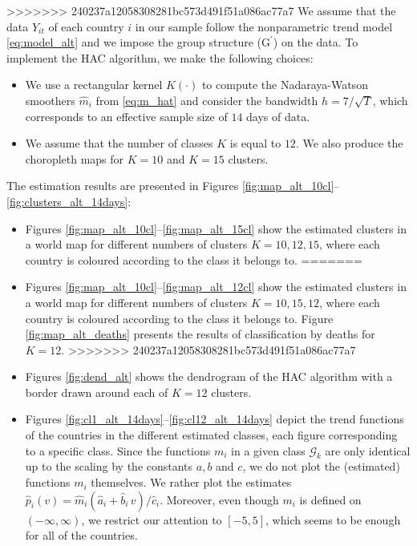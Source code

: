 \documentclass[a4paper,12pt]{article}
\numberwithin{equation}{section}
\begin{document}
>>>>>>> 240237a12058308281bc573d491f51a086ac77a7
We assume that the data $Y_{it}$ of each country $i$ in our sample follow the nonparametric trend model \eqref{eq:model_alt}
and we impose the group structure ($\text{G}^\prime$) on the data. 
To implement the HAC algorithm, we make the following choices:
\begin{itemize}[leftmargin=0.6cm]
\item We use a rectangular kernel $K(\cdot)$ to compute the Nadaraya-Watson smoothers $\hat{m}_{i}$ from \eqref{eq:m_hat} and consider the bandwidth $h = 7/\sqrt{T}$, which corresponds to an effective sample size of $14$ days of data. 
\item We assume that the number of classes $K$ is equal to $12$. We also produce the choropleth maps for $K=10$ and $K = 15$ clusters.
\end{itemize}
The estimation results are presented in Figures \ref{fig:map_alt_10cl}--\ref{fig:clusters_alt_14days}:
\begin{itemize}[leftmargin=0.6cm]
<<<<<<< HEAD
\item Figures \ref{fig:map_alt_10cl}--\ref{fig:map_alt_15cl} show the estimated clusters in a world map for different numbers of clusters $K =10, 12, 15$, where each country is coloured according to the class it belongs to. 
=======
\item Figures \ref{fig:map_alt_10cl}--\ref{fig:map_alt_12cl} show the estimated clusters in a world map for different numbers of clusters $K =10, 15, 12$, where each country is coloured according to the class it belongs to. Figure \ref{fig:map_alt_deaths} presents the results of classification by deaths for $K =12$.
>>>>>>> 240237a12058308281bc573d491f51a086ac77a7
\item Figures \ref{fig:dend_alt} shows the dendrogram of the HAC algorithm with a border drawn around each of $K = 12$ clusters.
\item Figures \ref{fig:cl1_alt_14days}--\ref{fig:cl12_alt_14days} depict the trend functions of the countries in the different estimated classes, each figure corresponding to a specific class. Since the functions $m_i$ in a given class $\mathcal{G}_k$ are only identical up to the scaling by the constants $a, b$ and $c$, we do not plot the (estimated) functions $m_i$ themselves. We rather plot the estimates $\hat{p}_i(v) = \hat{m}_i(\hat{a}_i + \hat{b}_i \, v)/\hat{c}_i$. Moreover, even though $m_i$ is defined on $(-\infty, \infty)$, we restrict our attention to $[-5, 5]$, which seems to be enough for all of the countries.
\end{itemize}
\end{document}
